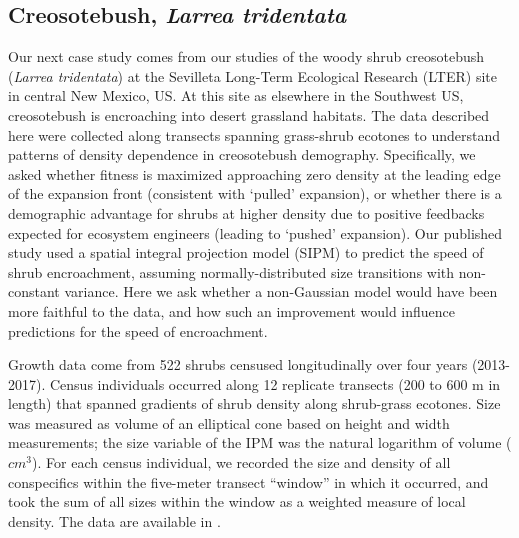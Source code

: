 \documentclass[12pt]{article}
\begin{document}
\begin{spacing}{1.35}
\subsection{Creosotebush, \emph{Larrea tridentata}}
\label{sec:creosotebush}
Our next case study comes from our studies of the woody shrub creosotebush (\emph{Larrea tridentata}) at the Sevilleta Long-Term Ecological Research (LTER) site in central New Mexico, US. 
At this site as elsewhere in the Southwest US, creosotebush is encroaching into desert grassland habitats.
The data described here were collected along transects spanning grass-shrub ecotones to understand patterns of density dependence in creosotebush demography.
Specifically, we asked whether fitness is maximized approaching zero density at the leading edge of the expansion front (consistent with `pulled' expansion), or whether there is a demographic advantage for shrubs at higher density due to positive feedbacks expected for ecosystem engineers (leading to `pushed' expansion). 
Our published study \citep{drees2023demography} used a spatial integral projection model (SIPM) to predict the speed of shrub encroachment, assuming normally-distributed size transitions with non-constant variance. 
Here we ask whether a non-Gaussian model would have been more faithful to the data, and how such an improvement would influence predictions for the speed of encroachment.

Growth data come from 522 shrubs censused longitudinally over four years (2013-2017). 
Census individuals occurred along 12 replicate transects (200 to 600 m in length) that spanned gradients of shrub density along shrub-grass ecotones. 
Size was measured as volume of an elliptical cone based on height and width measurements; the size variable of the IPM was the natural logarithm of volume ($cm^3$). 
For each census individual, we recorded the size and density of all conspecifics within the five-meter transect ``window'' in which it occurred, and took the sum of all sizes within the window as a weighted measure of local density. 
The data are available in \cite{shrubdata}. 


\end{spacing}
\end{document}
